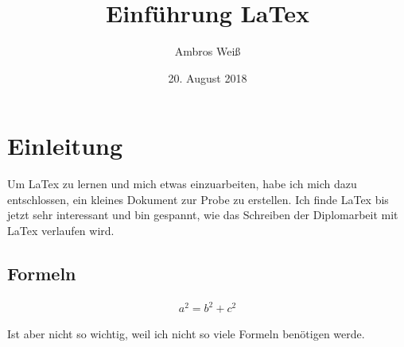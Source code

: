 \documentclass[a4paper,10pt]{scrartcl}
\title{Einführung LaTex}
\author{Ambros Weiß}
\date{20. August 2018}
\begin{document}
\maketitle
\tableofcontents

\section{Einleitung}

Um LaTex zu lernen und mich etwas einzuarbeiten, habe ich mich dazu entschlossen, ein kleines Dokument zur Probe zu erstellen. Ich finde LaTex bis jetzt sehr interessant und bin gespannt, wie das Schreiben der Diplomarbeit mit LaTex verlaufen wird.

\subsection{Formeln}
\begin{align}
a^2=b^2+c^2
\end{align}



Ist aber nicht so wichtig, weil ich nicht so viele Formeln benötigen werde.
\end{document}
